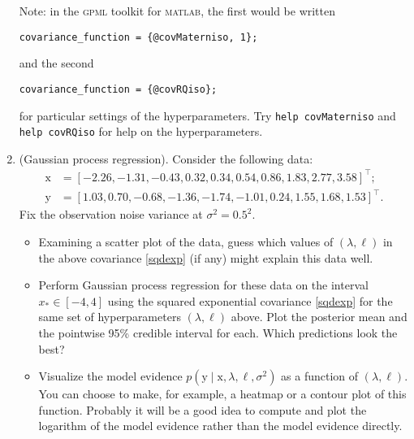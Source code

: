 \documentclass{article}
\newcommand{\acro}[1]{\textsc{\MakeLowercase{#1}}}
\newcommand{\given}{\mid}
\renewcommand{\vec}[1]{\bm{\mathrm{#1}}}
\newcommand{\trans}{^\top}
\begin{document}
\begin{enumerate}
  Note: in the \acro{GPML} toolkit for \acro{MATLAB,} the first would be written

  \verb|covariance_function = {@covMaterniso, 1};|

  and the second

  \verb|covariance_function = {@covRQiso};|

  for particular settings of the hyperparameters. Try \texttt{help covMaterniso}
  and \texttt{help covRQiso} for help on the hyperparameters.

\item
  (Gaussian process regression).
  Consider the following data:
  \begin{align*}
    \vec{x}
    &=
    [-2.26, -1.31, -0.43, 0.32, 0.34, 0.54, 0.86, 1.83, 2.77, 3.58]\trans; \\
    \vec{y}
    &=
    [1.03, 0.70, -0.68, -1.36, -1.74, -1.01, 0.24, 1.55, 1.68, 1.53]\trans.
  \end{align*}
  Fix the observation noise variance at $\sigma^2 = 0.5^2$.

  \begin{itemize}
  \item
    Examining a scatter plot of the data, guess which values of $(\lambda,
    \ell)$ in the above covariance \eqref{sqdexp} (if any) might explain this
    data well.
  \item
    Perform Gaussian process regression for these data on the interval $x_\ast
    \in [-4, 4]$ using the squared exponential covariance \eqref{sqdexp} for the
    same set of hyperparameters $(\lambda, \ell)$ above.  Plot the posterior
    mean and the pointwise 95\% credible interval for each.  Which predictions
    look the best?
  \item
    Visualize the model evidence $p(\vec{y} \given \vec{x}, \lambda, \ell,
    \sigma^2)$ as a function of $(\lambda, \ell)$.  You can choose to make, for
    example, a heatmap or a contour plot of this function.  Probably it will be
    a good idea to compute and plot the logarithm of the model evidence rather
    than the model evidence directly.
  \end{itemize}
\end{enumerate}
\end{document}

